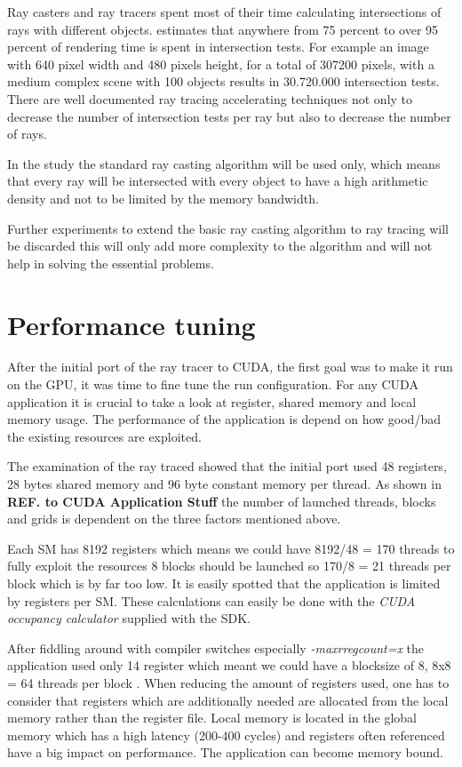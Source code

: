 Ray casters and ray tracers spent most of their time calculating intersections
of rays with different objects. \citeauthor{Whitted80} \citep{Whitted80} estimates
that anywhere from 75 percent to over 95 percent of rendering time is spent in
intersection tests. For example an image with 640 pixel width and 480 pixels
height, for a total of 307200 pixels, with a medium complex scene with 100
objects results in 30.720.000 intersection tests. There are well documented ray
tracing accelerating techniques not only to decrease the number of intersection
tests per ray but also to decrease the number of rays.

In the study the standard ray casting algorithm will be used only, which means
that every ray will be intersected with every object to have a high arithmetic
density and not to be limited by the memory bandwidth.

Further experiments to extend the basic ray casting algorithm to ray tracing 
will be discarded this will only add more complexity to the algorithm and will
not help in solving the essential problems. 

\section{Performance tuning} %
\label{sec:performance_tuning}

After the initial port of the ray tracer to \gls{CUDA}, the first goal was to 
make it run on the \gls{GPU}, it was time to fine tune the run configuration. 
For any \gls{CUDA} application it is crucial to take a look at register, shared 
memory and local memory usage. The performance of the application is depend on
how good/bad the existing resources are exploited.

The examination of the ray traced showed that the initial port used 48
registers, 28 bytes shared memory and 96 byte constant memory per thread. As
shown in \textbf{REF. to \gls{CUDA} Application Stuff} the number of launched threads,
blocks and grids is dependent on the three factors mentioned above.

Each \gls{SM} has 8192 registers which means we could have 8192/48 = 170 threads
to fully exploit the resources 8 blocks should be launched so 170/8 = 21 threads
per block which is by far too low. It is easily spotted that the application is
limited by registers per \gls{SM}. These calculations can easily be done with the
\emph{CUDA occupancy calculator} supplied with the SDK.

After fiddling around with compiler switches especially 
\emph{-maxrregcount=x}
the application used only 14 register which meant we could have a blocksize of
8, 8x8 = 64 threads per block . When reducing the amount of registers used, one
has to consider that registers which are additionally needed are allocated from
the local memory rather than the register file. Local memory is located in the
global memory which has a high latency (200-400 cycles) and registers often
referenced have a big impact on performance. The application can become memory
bound.

